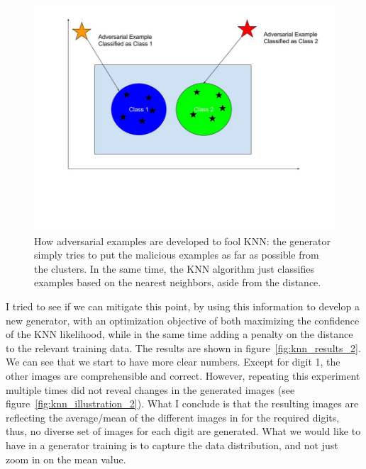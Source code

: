     \begin{figure}[!htbp]
      \centering
      \includegraphics[scale=0.5]{images/adv_attack/kNN_visualization.jpg}
      \caption{How adversarial examples are developed to fool KNN: the generator simply tries to put the malicious examples as far as possible from the clusters. In the same time, the KNN algorithm just classifies examples based on the nearest neighbors, aside from the distance.}
      \label{fig:knn_illustration_1}
    \end{figure}

    \par I tried to see if we can mitigate this point, by using this information to develop a new generator, with an optimization objective of both maximizing the confidence of the KNN likelihood, while in the same time adding a penalty on the distance to the relevant training data. The results are shown in figure~\ref{fig:knn_results_2}. We can see that we start to have more clear numbers. Except for digit 1, the other images are comprehensible and correct. However, repeating this experiment multiple times did not reveal changes in the generated images (see figure~\ref{fig:knn_illustration_2}). What I conclude is that the resulting images are reflecting the average/mean of the different images in for the required digits, thus, no diverse set of images for each digit are generated. What we would like to have in a generator training is to capture the data distribution, and not just zoom in on the mean value.

